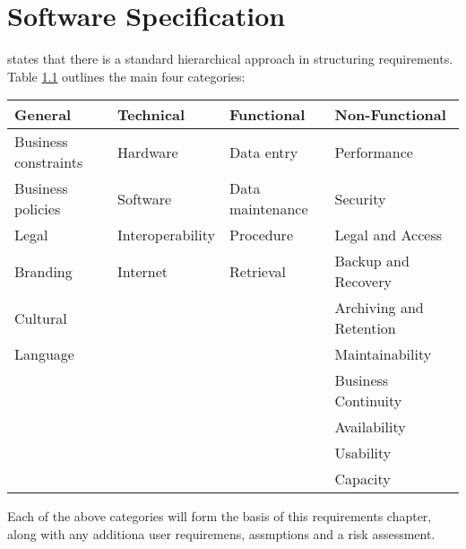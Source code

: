\chapter{Software Specification}
\label{chap:requirements}
\citet{cadle10} states that there is a standard hierarchical approach in 
structuring requirements. Table \ref{table:requirementsCategories} outlines
the main four categories:

\begin{table}[H]
  \begin{tabular}{|l|l|l|l|}
    \hline
    {\bf General} & {\bf Technical} & {\bf Functional} & {\bf Non-Functional} \\ 
    \hline
    Business constraints & Hardware & Data entry & Performance \\ 
    Business policies & Software & Data maintenance & Security \\ 
    Legal & Interoperability & Procedure & Legal and Access \\ 
    Branding & Internet & Retrieval & Backup and Recovery \\ 
    Cultural & ~ & ~ & Archiving and Retention \\ 
    Language & ~ & ~ & Maintainability \\ 
    ~ & ~ & ~ & Business Continuity \\ 
    ~ & ~ & ~ & Availability \\ 
    ~ & ~ & ~ & Usability \\ 
    ~ & ~ & ~ & Capacity \\
    \hline
  \end{tabular}
  \label{table:requirementsCategories}
\end{table}

Each of the above categories will form the basis of this requirements chapter,
along with any additiona user requiremens, assmptions and a risk assessment.

\newpage


\newpage


\newpage


\newpage


\newpage


\newpage


\newpage

